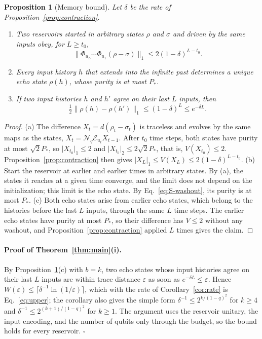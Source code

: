 \documentclass[aps,prl,twocolumn,superscriptaddress,floatfix]{revtex4-2}
\theoremstyle{plain}
\newtheorem{proposition}[lemma]{Proposition}
\newcommand{\nrm}[2]{\lvert #1\rvert_{#2}}
\newcommand{\Norm}[1]{\lVert #1\rVert}
\newcommand{\cE}{\mathcal E}
\newcommand{\Nq}{\mathcal N_q}
\begin{document}
\begin{proposition}[Memory bound]\label{prop:echo}
Let $\delta$ be the rate of Proposition~\ref{prop:contraction}.
\begin{enumerate}
\item[(a)] Two reservoirs started in arbitrary states $\rho$ and $\sigma$ and driven by the same inputs obey, for $L\ge t_0$,
\[
\Norm{\Phi_{u_L}\cdots\Phi_{u_1}(\rho-\sigma)}_1\le2(1-\delta)^{L-t_0}.
\]
\item[(b)] Every input history $h$ that extends into the infinite past determines a unique echo state $\rho(h)$, whose purity is at most $P_*$.
\item[(c)] If two input histories $h$ and $h'$ agree on their last $L$ inputs, then
\[
\tfrac12\Norm{\rho(h)-\rho(h')}_1\le(1-\delta)^L\le e^{-\delta L}.
\]
\end{enumerate}
\end{proposition}

\begin{proof}
(a) The difference $X_t=d(\rho_t-\sigma_t)$ is traceless and evolves by the same maps as the states, $X_t=\Nq\cE_{u_t}X_{t-1}$. After $t_0$ time steps, both states have purity at most $\sqrt2P_*$, so $\nrm{X_{t_0}}1\le2$ and $\nrm{X_{t_0}}2\le2\sqrt2P_*$, that is, $V(X_{t_0})\le2$. Proposition~\ref{prop:contraction} then gives $\nrm{X_L}1\le V(X_L)\le2(1-\delta)^{L-t_0}$.
(b) Start the reservoir at earlier and earlier times in arbitrary states. By (a), the states it reaches at a given time converge, and the limit does not depend on the initialization; this limit is the echo state. By Eq.~\eqref{eq:S-washout}, its purity is at most $P_*$.
(c) Both echo states arise from earlier echo states, which belong to the histories before the last $L$ inputs, through the same $L$ time steps. The earlier echo states have purity at most $P_*$, so their difference has $V\le2$ without any washout, and Proposition~\ref{prop:contraction} applied $L$ times gives the claim.
\end{proof}

\paragraph*{Proof of Theorem~\ref{thm:main}(i).} By Proposition~\ref{prop:echo}(c) with $b=k$, two echo states whose input histories agree on their last $L$ inputs are within trace distance $\varepsilon$ as soon as $e^{-\delta L}\le\varepsilon$. Hence $W(\varepsilon)\le\lceil\delta^{-1}\ln(1/\varepsilon)\rceil$, which with the rate of Corollary~\ref{cor:rate} is Eq.~\eqref{eq:upper}; the corollary also gives the simple form $\delta^{-1}\le2^{k/(1-q)^2}$ for $k\ge4$ and $\delta^{-1}\le2^{(k+1)/(1-q)^2}$ for $k\ge1$. The argument uses the reservoir unitary, the input encoding, and the number of qubits only through the budget, so the bound holds for every reservoir. \hfill$\square$
\end{document}
